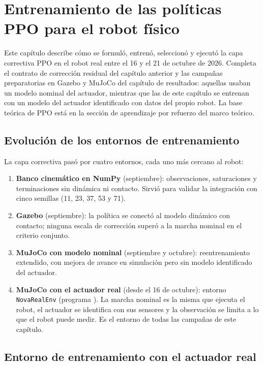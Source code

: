 \chapter{Entrenamiento de las políticas PPO para el robot físico}
\label{cap:ppo-fisico}

Este capítulo describe cómo se formuló, entrenó, seleccionó y ejecutó la capa
correctiva PPO en el robot real entre el 16 y el 21 de octubre de 2026. Completa
el contrato de corrección residual del capítulo anterior y las campañas
preparatorias en Gazebo y MuJoCo del capítulo de resultados: aquellas usaban un
modelo nominal del actuador, mientras que las de este capítulo se entrenan con
un modelo del actuador identificado con datos del propio robot. La base teórica
de PPO está en la sección de aprendizaje por refuerzo del marco teórico.

\section{Evolución de los entornos de entrenamiento}

La capa correctiva pasó por cuatro entornos, cada uno más cercano al robot:
\begin{enumerate}
    \item \textbf{Banco cinemático en NumPy} (septiembre): observaciones,
    saturaciones y terminaciones sin dinámica ni contacto. Sirvió para validar
    la integración con cinco semillas (11, 23, 37, 53 y 71).
    \item \textbf{Gazebo} (septiembre): la política se conectó al modelo
    dinámico con contacto; ninguna escala de corrección superó a la marcha
    nominal en el criterio conjunto.
    \item \textbf{MuJoCo con modelo nominal} (septiembre y octubre):
    reentrenamiento extendido, con mejora de avance en simulación pero sin
    modelo identificado del actuador.
    \item \textbf{MuJoCo con el actuador real} (desde el 16 de octubre): entorno
    \texttt{NovaRealEnv} (programa ).
    La marcha nominal es la misma que ejecuta el robot, el actuador se
    identifica con sus sensores y la observación se limita a lo que el robot
    puede medir. Es el entorno de todas las campañas de este capítulo.
\end{enumerate}

\section{Entorno de entrenamiento con el actuador real}

